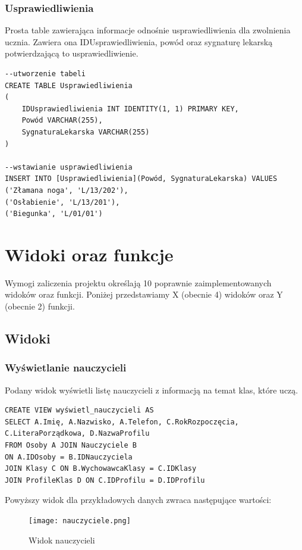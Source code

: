 \documentclass[60pt]{article}
\begin{document}
\subsubsection{Usprawiedliwienia}
Prosta table zawierająca informacje odnośnie usprawiedliwienia dla zwolnienia ucznia. Zawiera ona IDUsprawiedliwienia, powód oraz sygnaturę lekarską potwierdzającą to usprawiedliwienie.

\begin{verbatim}
--utworzenie tabeli
CREATE TABLE Usprawiedliwienia
(
    IDUsprawiedliwienia INT IDENTITY(1, 1) PRIMARY KEY,
    Powód VARCHAR(255),
    SygnaturaLekarska VARCHAR(255)
)

--wstawianie usprawiedliwienia 
INSERT INTO [Usprawiedliwienia](Powód, SygnaturaLekarska) VALUES
('Złamana noga', 'L/13/202'),
('Osłabienie', 'L/13/201'),
('Biegunka', 'L/01/01')
\end{verbatim}

\newpage

\section{Widoki oraz funkcje}

Wymogi zaliczenia projektu określają 10 poprawnie zaimplementowanych widoków oraz funkcji. Poniżej przedstawiamy X (obecnie 4) widoków oraz Y (obecnie 2) funkcji.

\subsection{Widoki}

\subsubsection{Wyświetlanie nauczycieli}

Podany widok wyświetli listę nauczycieli z informacją na temat klas, które uczą. 

\begin{verbatim}
CREATE VIEW wyświetl_nauczycieli AS
SELECT A.Imię, A.Nazwisko, A.Telefon, C.RokRozpoczęcia, C.LiteraPorządkowa, D.NazwaProfilu
FROM Osoby A JOIN Nauczyciele B
ON A.IDOsoby = B.IDNauczyciela
JOIN Klasy C ON B.WychowawcaKlasy = C.IDKlasy
JOIN ProfileKlas D ON C.IDProfilu = D.IDProfilu
\end{verbatim}

Powyższy widok dla przykładowych danych zwraca następujące wartości:

\begin{figure}[h]
  \texttt{[image: nauczyciele.png]}
  \caption{Widok nauczycieli}
  \label{Widok nauczycieli}
\end{figure}
\end{document}
